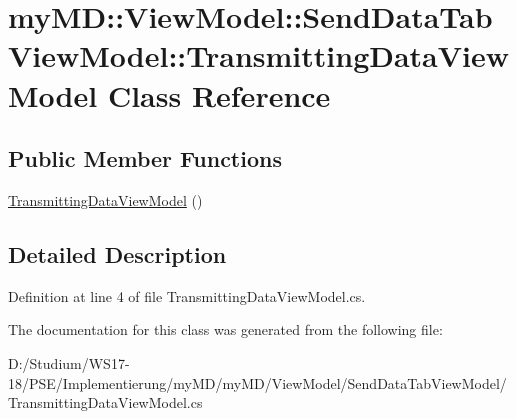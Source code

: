 \hypertarget{classmy_m_d_1_1_view_model_1_1_send_data_tab_view_model_1_1_transmitting_data_view_model}{
\section{my\-MD::View\-Model::Send\-Data\-Tab\-View\-Model::Transmitting\-Data\-View\-Model Class Reference}
\label{d6/dd7/classmy_m_d_1_1_view_model_1_1_send_data_tab_view_model_1_1_transmitting_data_view_model}
}
\subsection*{Public Member Functions}
\begin{CompactItemize}
\item 
\hypertarget{classmy_m_d_1_1_view_model_1_1_send_data_tab_view_model_1_1_transmitting_data_view_model_e8c87d01da73b87a11385e7516f01f5c}{
\hyperlink{classmy_m_d_1_1_view_model_1_1_send_data_tab_view_model_1_1_transmitting_data_view_model_e8c87d01da73b87a11385e7516f01f5c}{Transmitting\-Data\-View\-Model} ()}
\label{d6/dd7/classmy_m_d_1_1_view_model_1_1_send_data_tab_view_model_1_1_transmitting_data_view_model_e8c87d01da73b87a11385e7516f01f5c}

\end{CompactItemize}


\subsection{Detailed Description}




Definition at line 4 of file Transmitting\-Data\-View\-Model.cs.

The documentation for this class was generated from the following file:\begin{CompactItemize}
\item 
D:/Studium/WS17-18/PSE/Implementierung/my\-MD/my\-MD/View\-Model/Send\-Data\-Tab\-View\-Model/Transmitting\-Data\-View\-Model.cs\end{CompactItemize}

